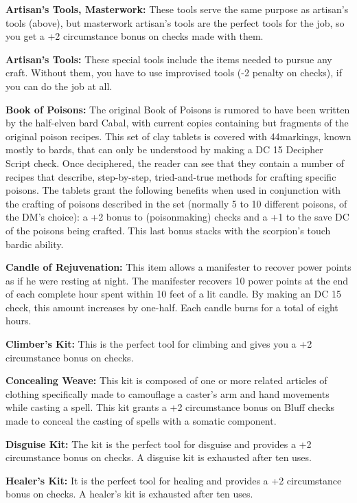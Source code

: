\textbf{Artisan's Tools, Masterwork:} These tools serve the same purpose as artisan's tools (above), but masterwork artisan's tools are the perfect tools for the job, so you get a +2 circumstance bonus on  checks made with them.

\textbf{Artisan's Tools:} These special tools include the items needed to pursue any craft. Without them, you have to use improvised tools (-2 penalty on  checks), if you can do the job at all.

\textbf{Book of Poisons:} The original Book of Poisons is rumored  to have been written by the half-elven bard Cabal, with  current copies containing but fragments of the original  poison recipes. This set of clay tablets is covered with  44markings, known mostly to bards, that can only be  understood by making a DC 15 Decipher Script check. Once  deciphered, the reader can see that they contain a number of  recipes that describe, step-by-step, tried-and-true methods  for crafting specific poisons. The tablets grant the following  benefits when used in conjunction with the crafting of  poisons described in the set (normally 5 to 10 different poisons, of the DM's choice): a +2 bonus to   (poisonmaking) checks and a +1 to the save DC of the  poisons being crafted. This last bonus stacks with the  scorpion's touch bardic ability.

\textbf{Candle of Rejuvenation:} This item allows a manifester  to recover power points as if he were resting at night. The  manifester recovers 10 power points at the end of each  complete hour spent within 10 feet of a lit candle. By  making an  DC 15 check, this amount  increases by one-half. Each candle burns for a total of eight  hours.

\textbf{Climber's Kit:} This is the perfect tool for climbing and gives you a +2 circumstance bonus on  checks.

\textbf{Concealing Weave:} This kit is composed of one or more  related articles of clothing specifically made to camouflage a  caster's arm and hand movements while casting a spell.  This kit grants a +2 circumstance bonus on Bluff checks  made to conceal the casting of spells with a somatic  component.

\textbf{Disguise Kit:} The kit is the perfect tool for disguise and provides a +2 circumstance bonus on  checks. A disguise kit is exhausted after ten uses.

\textbf{Healer's Kit:} It is the perfect tool for healing and provides a +2 circumstance bonus on  checks. A healer's kit is exhausted after ten uses.

